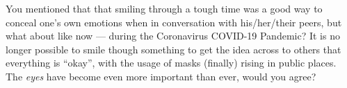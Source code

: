       You mentioned that that smiling through a tough time was a good way to
        conceal one's own emotions when in conversation with his/her/their
        peers, but what about like now --- during the Coronavirus COVID-19
        Pandemic? It is no longer possible to smile though something to get
        the idea across to others that everything is ``okay'', with the usage
        of masks (finally) rising in public places. The \textit{eyes} have
        become even more important than ever, would you agree?
